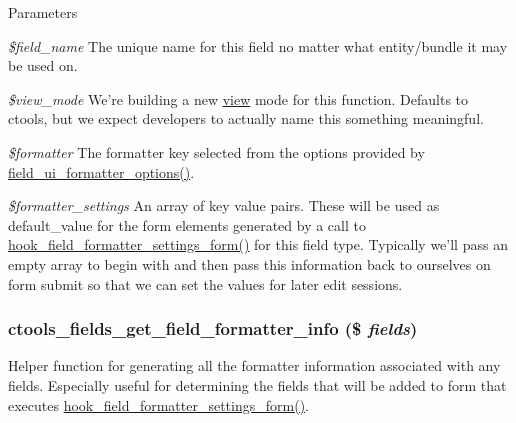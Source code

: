 \begin{DoxyParams}{Parameters}
\item[{\em \$field\_\-name}]The unique name for this field no matter what entity/bundle it may be used on. \item[{\em \$view\_\-mode}]We're building a new \hyperlink{classview}{view} mode for this function. Defaults to ctools, but we expect developers to actually name this something meaningful. \item[{\em \$formatter}]The formatter key selected from the options provided by \hyperlink{field__ui_8admin_8inc_a88c9dd1dd2d56b80a7ab2b0ef9b2632b}{field\_\-ui\_\-formatter\_\-options()}. \item[{\em \$formatter\_\-settings}]An array of key value pairs. These will be used as default\_\-value for the form elements generated by a call to \hyperlink{group__field__types_gaf9b6aefe0b4fe6c03ebd5bd9bd1b891b}{hook\_\-field\_\-formatter\_\-settings\_\-form()} for this field type. Typically we'll pass an empty array to begin with and then pass this information back to ourselves on form submit so that we can set the values for later edit sessions. \end{DoxyParams}
\hypertarget{fields_8inc_a178ae8d6cf7ee3d40a388b1c3e09f896}{
\subsubsection[{ctools\_\-fields\_\-get\_\-field\_\-formatter\_\-info}]{\setlength{\rightskip}{0pt plus 5cm}ctools\_\-fields\_\-get\_\-field\_\-formatter\_\-info (\$ {\em fields})}}
\label{fields_8inc_a178ae8d6cf7ee3d40a388b1c3e09f896}
Helper function for generating all the formatter information associated with any fields. Especially useful for determining the fields that will be added to form that executes \hyperlink{group__field__types_gaf9b6aefe0b4fe6c03ebd5bd9bd1b891b}{hook\_\-field\_\-formatter\_\-settings\_\-form()}.


